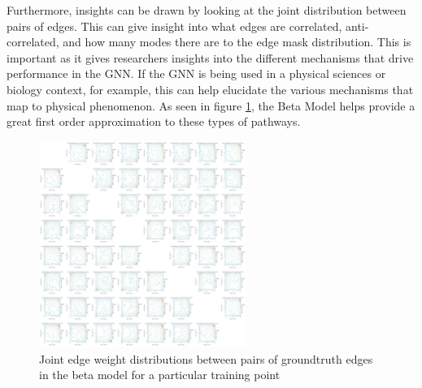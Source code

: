 Furthermore, insights can be drawn by looking at the joint distribution between pairs of edges. This can give insight into what edges are correlated, anti-correlated, and how many modes there are to the edge mask distribution. This is important as it gives researchers insights into the different mechanisms that drive performance in the GNN. If the GNN is being used in a physical sciences or biology context, for example, this can help elucidate the various mechanisms that map to physical phenomenon. As seen in figure \ref{fig:tree-model-beta-joint}, the Beta Model helps provide a great first order approximation to these types of pathways.
\begin{figure}[htb]
	\centering
	\includegraphics[width=0.6\textwidth]{images/tree-model-beta-joint.pdf}
	\caption{Joint edge weight distributions between pairs of groundtruth edges in the beta model for a particular training point}
	\label{fig:tree-model-beta-joint}
\end{figure}

